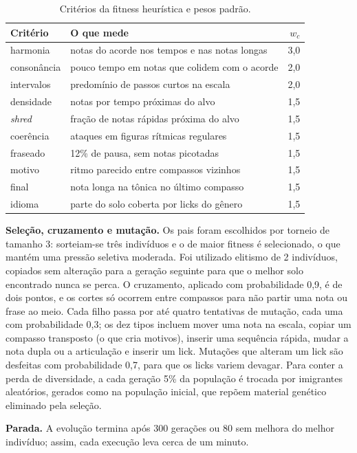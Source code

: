 \documentclass{article}
\begin{document}
\begin{table}[t]
\centering\footnotesize
\begin{tabular}{@{}l l r@{}}
\toprule
Critério & O que mede & $w_c$ \\
\midrule
harmonia & notas do acorde nos tempos e nas notas longas & 3,0\\
consonância & pouco tempo em notas que colidem com o acorde & 2,0\\
intervalos & predomínio de passos curtos na escala & 2,0\\
densidade & notas por tempo próximas do alvo & 1,5\\
\emph{shred} & fração de notas rápidas próxima do alvo & 1,5\\
coerência & ataques em figuras rítmicas regulares & 1,5\\
fraseado & 12\% de pausa, sem notas picotadas & 1,5\\
motivo & ritmo parecido entre compassos vizinhos & 1,5\\
final & nota longa na tônica no último compasso & 1,5\\
idioma & parte do solo coberta por licks do gênero & 1,5\\
\bottomrule
\end{tabular}
\caption{Critérios da fitness heurística e pesos padrão.}
\label{tab:fitness}
\end{table}

\textbf{Seleção, cruzamento e mutação.} Os pais foram escolhidos por torneio de tamanho
3: sorteiam-se três indivíduos e o de maior fitness é selecionado, o que mantém uma
pressão seletiva moderada. Foi utilizado elitismo de 2 indivíduos, copiados sem
alteração para a geração seguinte para que o melhor solo encontrado nunca se perca. O
cruzamento, aplicado com probabilidade 0,9, é de dois pontos, e os cortes só ocorrem
entre compassos para não partir uma nota ou frase ao meio. Cada filho passa por até
quatro tentativas de mutação, cada uma com probabilidade 0,3; os dez tipos incluem
mover uma nota na escala, copiar um compasso transposto (o que cria motivos), inserir
uma sequência rápida, mudar a nota dupla ou a articulação e inserir um lick. Mutações que alteram um lick são
desfeitas com probabilidade 0,7, para que os licks variem devagar. Para conter a perda
de diversidade, a cada geração 5\% da população é trocada por imigrantes aleatórios,
gerados como na população inicial, que repõem material genético eliminado pela seleção.

\textbf{Parada.} A evolução termina após 300 gerações ou 80 sem melhora do melhor
indivíduo; assim, cada execução leva cerca de um minuto.
\end{document}
